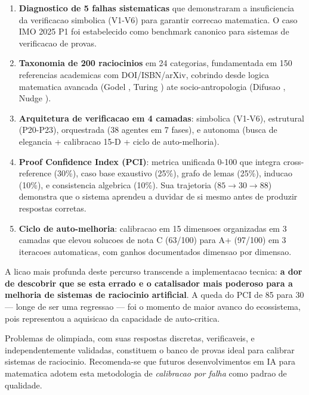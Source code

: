 \documentclass[5p]{elsarticle}
\begin{document}
\begin{enumerate}[label=(\arabic*)]
  \item \textbf{Diagnostico de 5 falhas sistematicas} que demonstraram a
    insuficiencia da verificacao simbolica (V1-V6) para garantir correcao
    matematica. O caso IMO 2025 P1 foi estabelecido como benchmark canonico
    para sistemas de verificacao de provas.

  \item \textbf{Taxonomia de 200 raciocinios} em 24 categorias, fundamentada
    em 150 referencias academicas com DOI/ISBN/arXiv, cobrindo desde logica
    matematica avancada (Godel \cite{godel1931}, Turing \cite{turing1936})
    ate socio-antropologia (Difusao \cite{granovetter1973}, Nudge
    \cite{thaler2008}).

  \item \textbf{Arquitetura de verificacao em 4 camadas}: simbolica (V1-V6),
    estrutural (P20-P23), orquestrada (38 agentes em 7 fases), e autonoma
    (busca de elegancia + calibracao 15-D + ciclo de auto-melhoria).

  \item \textbf{Proof Confidence Index (PCI)}: metrica unificada 0-100 que
    integra cross-reference (30\%), caso base exaustivo (25\%), grafo de
    lemas (25\%), inducao (10\%), e consistencia algebrica (10\%). Sua
    trajetoria ($85\to30\to88$) demonstra que o sistema aprendeu a duvidar
    de si mesmo antes de produzir respostas corretas.

  \item \textbf{Ciclo de auto-melhoria}: calibracao em 15 dimensoes organizadas
    em 3 camadas que elevou solucoes de nota C (63/100) para A+ (97/100) em
    3 iteracoes automaticas, com ganhos documentados dimensao por dimensao.
\end{enumerate}

A licao mais profunda deste percurso transcende a implementacao tecnica:
\textbf{a dor de descobrir que se esta errado e o catalisador mais poderoso
para a melhoria de sistemas de raciocinio artificial}. A queda do PCI de
85 para 30 --- longe de ser uma regressao --- foi o momento de maior avanco
do ecossistema, pois representou a aquisicao da capacidade de auto-critica.

Problemas de olimpiada, com suas respostas discretas, verificaveis, e
independentemente validadas, constituem o banco de provas ideal para calibrar
sistemas de raciocinio. Recomenda-se que futuros desenvolvimentos em IA para
matematica adotem esta metodologia de \textit{calibracao por falha} como
padrao de qualidade.
\end{document}
